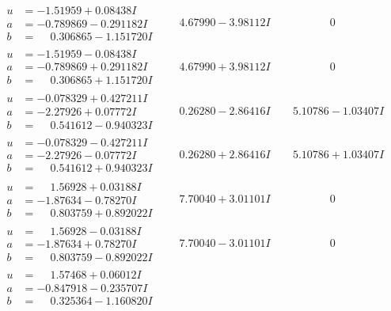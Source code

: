 \documentclass[1p]{elsarticle_modified}
\theoremstyle{definition}
\begin{document}
$$\begin{array}{c|c|c}
\begin{aligned}
u &= -1.51959 + 0.08438 I \\
a &= -0.789869 - 0.291182 I \\
b &= \phantom{-}0.306865 - 1.151720 I\end{aligned}
 & \phantom{-}4.67990 - 3.98112 I & \phantom{-0.000000 } 0 \\ \hline\begin{aligned}
u &= -1.51959 - 0.08438 I \\
a &= -0.789869 + 0.291182 I \\
b &= \phantom{-}0.306865 + 1.151720 I\end{aligned}
 & \phantom{-}4.67990 + 3.98112 I & \phantom{-0.000000 } 0 \\ \hline\begin{aligned}
u &= -0.078329 + 0.427211 I \\
a &= -2.27926 + 0.07772 I \\
b &= \phantom{-}0.541612 - 0.940323 I\end{aligned}
 & \phantom{-}0.26280 - 2.86416 I & \phantom{-}5.10786 - 1.03407 I \\ \hline\begin{aligned}
u &= -0.078329 - 0.427211 I \\
a &= -2.27926 - 0.07772 I \\
b &= \phantom{-}0.541612 + 0.940323 I\end{aligned}
 & \phantom{-}0.26280 + 2.86416 I & \phantom{-}5.10786 + 1.03407 I \\ \hline\begin{aligned}
u &= \phantom{-}1.56928 + 0.03188 I \\
a &= -1.87634 - 0.78270 I \\
b &= \phantom{-}0.803759 + 0.892022 I\end{aligned}
 & \phantom{-}7.70040 + 3.01101 I & \phantom{-0.000000 } 0 \\ \hline\begin{aligned}
u &= \phantom{-}1.56928 - 0.03188 I \\
a &= -1.87634 + 0.78270 I \\
b &= \phantom{-}0.803759 - 0.892022 I\end{aligned}
 & \phantom{-}7.70040 - 3.01101 I & \phantom{-0.000000 } 0 \\ \hline\begin{aligned}
u &= \phantom{-}1.57468 + 0.06012 I \\
a &= -0.847918 - 0.235707 I \\
b &= \phantom{-}0.325364 - 1.160820 I\end{aligned}

\end{array}$$
\end{document}
